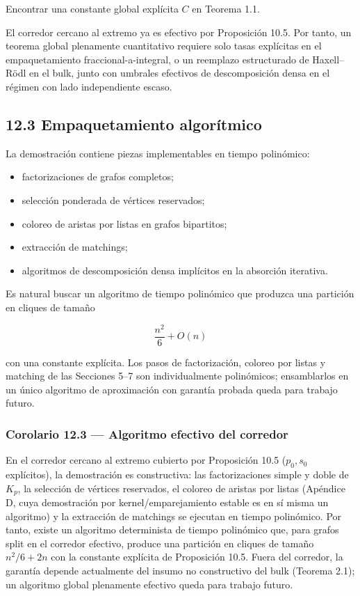 \documentclass[
  11pt,
]{article}
\providecommand{\tightlist}{%
  \setlength{\itemsep}{0pt}\setlength{\parskip}{0pt}}
\begin{document}
Encontrar una constante global explícita \(C\) en Teorema 1.1.

El corredor cercano al extremo ya es efectivo por Proposición 10.5. Por tanto, un teorema global plenamente cuantitativo requiere solo tasas explícitas en el empaquetamiento fraccional-a-integral, o un reemplazo estructurado de Haxell--Rödl en el bulk, junto con umbrales efectivos de descomposición densa en el régimen con lado independiente escaso.

\subsection{12.3 Empaquetamiento algorítmico}\label{empaquetamiento-algoruxedtmico}

La demostración contiene piezas implementables en tiempo polinómico:

\begin{itemize}
\tightlist
\item
  factorizaciones de grafos completos;
\item
  selección ponderada de vértices reservados;
\item
  coloreo de aristas por listas en grafos bipartitos;
\item
  extracción de matchings;
\item
  algoritmos de descomposición densa implícitos en la absorción iterativa.
\end{itemize}

Es natural buscar un algoritmo de tiempo polinómico que produzca una partición en cliques de tamaño

\[
\frac{n^2}{6}+O(n)
\]

con una constante explícita. Los pasos de factorización, coloreo por listas y matching de las Secciones 5--7 son individualmente polinómicos; ensamblarlos en un único algoritmo de aproximación con garantía probada queda para trabajo futuro.

\subsubsection{Corolario 12.3 --- Algoritmo efectivo del corredor}\label{corolario-12.3-algoritmo-efectivo-del-corredor}

En el corredor cercano al extremo cubierto por Proposición 10.5 (\(p_0,s_0\) explícitos), la demostración es constructiva: las factorizaciones simple y doble de \(K_p\), la selección de vértices reservados, el coloreo de aristas por listas (Apéndice D, cuya demostración por kernel/emparejamiento estable es en sí misma un algoritmo) y la extracción de matchings se ejecutan en tiempo polinómico. Por tanto, existe un algoritmo determinista de tiempo polinómico que, para grafos split en el corredor efectivo, produce una partición en cliques de tamaño \(n^2/6+2n\) con la constante explícita de Proposición 10.5. Fuera del corredor, la garantía depende actualmente del insumo no constructivo del bulk (Teorema 2.1); un algoritmo global plenamente efectivo queda para trabajo futuro.
\end{document}
